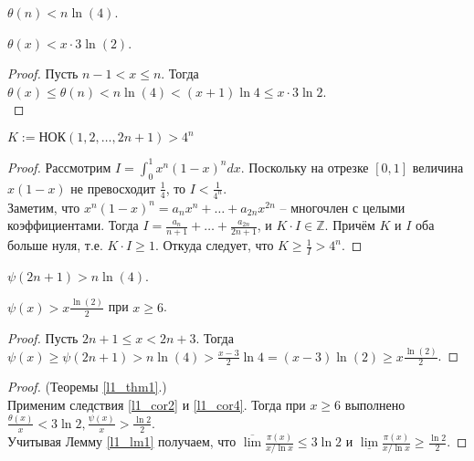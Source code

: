 \begin{corollary} \label{l1_cor1}
    $\theta(n) < n \ln(4)$.
\end{corollary}

\begin{corollary} \label{l1_cor2}
    $\theta(x) < x \cdot 3 \ln(2)$.
\end{corollary}
\begin{proof}
    Пусть $n - 1 < x \leq n$. Тогда $\theta(x) \leq \theta(n) < n \ln(4) < (x + 1) \ln 4 \leq x \cdot 3\ln 2$.\\
\end{proof}

\begin{lemma} \label{l1_lm3}
    $K := \text{НОК}\left( 1, 2, \ldots, 2n + 1 \right) > 4^n$
\end{lemma}
\begin{proof}
    Рассмотрим $\displaystyle I = \int_{0}^{1} x^n (1 - x)^n dx$. Поскольку на отрезке $[0, 1]$ величина $x(1 - x)$ не превосходит $\displaystyle \frac{1}{4}$, то $\displaystyle I < \frac{1}{4^n}$.\\
    Заметим, что $x^n(1 - x)^n = a_n  x^n + \ldots + a_{2n} x^{2n}$ -- многочлен с целыми коэффициентами. Тогда $\displaystyle I = \frac{a_n}{n + 1} + \ldots + \frac{a_{2n}}{2n + 1}$, и $K \cdot I \in \mathbb{Z}$. Причём $K$ и $I$ оба больше нуля, т.е. $K \cdot I \geq 1$. Откуда следует, что $\displaystyle K \geq \frac{1}{I} > 4^n$.
\end{proof}

\begin{corollary} \label{l1_cor3}
    $\psi(2n+1) > n \ln(4)$.
\end{corollary}

\begin{corollary} \label{l1_cor4}
    $\psi(x) > x \frac{\ln(2)}{2}$ при $x \geq 6$.
\end{corollary}
\begin{proof}
    Пусть $2n+1 \leq x < 2n+3$. Тогда 
    $\displaystyle \psi(x) \geq \psi(2n+1) > n \ln(4) > \frac{x - 3}{2} \ln 4 = (x-3) \ln(2) \geq x \frac{\ln(2)}{2}$.
\end{proof}

\begin{proof} (Теоремы \ref{l1_thm1}.)~\\
    Применим следствия \ref{l1_cor2} и \ref{l1_cor4}. Тогда при $x \geq 6$ выполнено
	$\displaystyle  \frac{\theta(x)}{x} < 3 \ln 2, \frac{\psi(x)}{x} > \frac{\ln 2}{2}$.\\
    Учитывая Лемму \ref{l1_lm1} получаем, что $\displaystyle \overline{\lim} \frac{\pi(x)}{x / \ln x} \leq 3 \ln 2$ и 
    $\displaystyle \underline{\lim} \frac{\pi(x)}{x / \ln x} \geq \frac{\ln 2}{2}$.
\end{proof}

